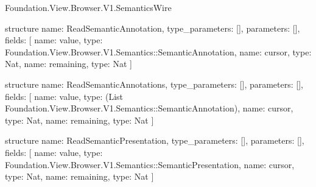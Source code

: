 \begin{lexlean}{Foundation.View.Browser.V1.SemanticsWire}
\begin{semanticmodule}
structure{
  name: ReadSemanticAnnotation,
  type_parameters: [],
  parameters: [],
  fields: [
    {name: value, type: Foundation.View.Browser.V1.Semantics::SemanticAnnotation},
    {name: cursor, type: Nat},
    {name: remaining, type: Nat}
  ]
}

structure{
  name: ReadSemanticAnnotations,
  type_parameters: [],
  parameters: [],
  fields: [
    {name: value, type: (List Foundation.View.Browser.V1.Semantics::SemanticAnnotation)},
    {name: cursor, type: Nat},
    {name: remaining, type: Nat}
  ]
}

structure{
  name: ReadSemanticPresentation,
  type_parameters: [],
  parameters: [],
  fields: [
    {name: value, type: Foundation.View.Browser.V1.Semantics::SemanticPresentation},
    {name: cursor, type: Nat},
    {name: remaining, type: Nat}
  ]
}


\end{semanticmodule}
\end{lexlean}
